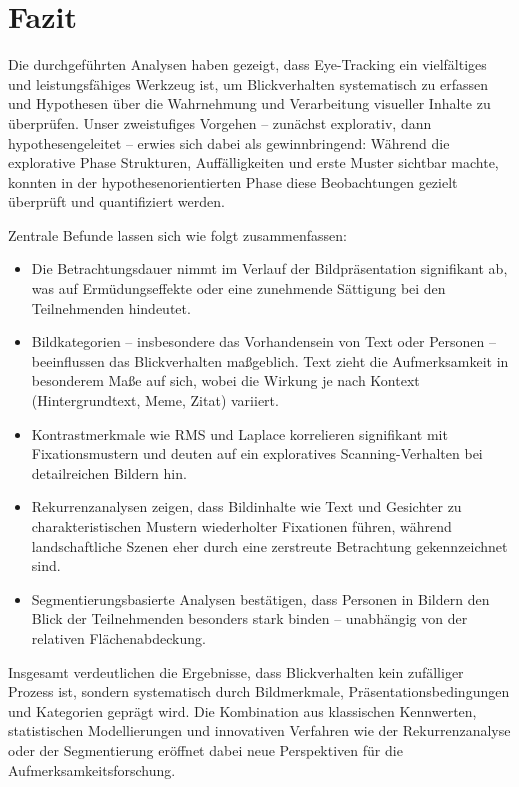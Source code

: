 \documentclass[
    language=german, %
    thesis=seminar, %
    supervisor=postdoc, %
    multiauthor=true, %
    ]{settings/csssa-thesis}
\begin{document}
\section{Fazit}

Die durchgeführten Analysen haben gezeigt, dass Eye-Tracking ein vielfältiges und leistungsfähiges Werkzeug ist, 
um Blickverhalten systematisch zu erfassen und Hypothesen über die Wahrnehmung und Verarbeitung visueller Inhalte 
zu überprüfen. Unser zweistufiges Vorgehen – zunächst explorativ, dann hypothesengeleitet – erwies sich dabei als 
gewinnbringend: Während die explorative Phase Strukturen, Auffälligkeiten und erste Muster sichtbar machte, 
konnten in der hypothesenorientierten Phase diese Beobachtungen gezielt überprüft und quantifiziert werden. 

Zentrale Befunde lassen sich wie folgt zusammenfassen: 
\begin{itemize}
    \item Die Betrachtungsdauer nimmt im Verlauf der Bildpräsentation signifikant ab, 
    was auf Ermüdungseffekte oder eine zunehmende Sättigung bei den Teilnehmenden hindeutet. 
    \item Bildkategorien – insbesondere das Vorhandensein von Text oder Personen – 
    beeinflussen das Blickverhalten maßgeblich. Text zieht die Aufmerksamkeit in besonderem Maße auf sich, 
    wobei die Wirkung je nach Kontext (Hintergrundtext, Meme, Zitat) variiert. 
    \item Kontrastmerkmale wie RMS und Laplace korrelieren signifikant mit Fixationsmustern 
    und deuten auf ein exploratives Scanning-Verhalten bei detailreichen Bildern hin. 
    \item Rekurrenzanalysen zeigen, dass Bildinhalte wie Text und Gesichter zu charakteristischen 
    Mustern wiederholter Fixationen führen, während landschaftliche Szenen eher durch eine zerstreute 
    Betrachtung gekennzeichnet sind. 
    \item Segmentierungsbasierte Analysen bestätigen, dass Personen in Bildern 
    den Blick der Teilnehmenden besonders stark binden – unabhängig von der relativen Flächenabdeckung. 
\end{itemize}
\hfill
\newline Insgesamt verdeutlichen die Ergebnisse, dass Blickverhalten kein zufälliger Prozess ist, 
sondern systematisch durch Bildmerkmale, Präsentationsbedingungen und Kategorien geprägt wird. 
Die Kombination aus klassischen Kennwerten, statistischen Modellierungen und innovativen Verfahren 
wie der Rekurrenzanalyse oder der Segmentierung eröffnet dabei neue Perspektiven für die 
Aufmerksamkeitsforschung. 
\end{document}
